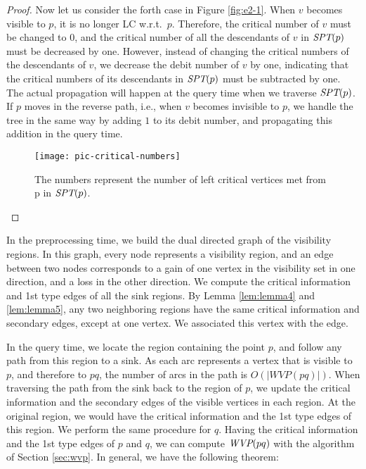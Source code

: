 \documentclass[5p]{elsarticle}
\def\WVP{\mbox{\it{WVP}}}
\def\SPT{\mbox{\it{SPT}}}
\begin{document}
\begin{proof}
Now let us consider the forth case in Figure \ref{fig:e2-1}. When $v$ becomes visible to $p$,
it is no longer LC w.r.t.\ $p$. Therefore, the critical number of $v$ must be changed to $0$,
and the critical number of all the descendants of $v$ in $\SPT(p)$ must be decreased by one.
However, instead of changing the critical numbers of the descendants of $v$, 
we decrease the debit number of $v$ by one, indicating that the critical numbers of 
its descendants in $\SPT(p)$ must be subtracted by one. The actual propagation 
will happen at the query time when we traverse $\SPT(p)$. 
If $p$ moves in the reverse path, i.e., when $v$ becomes 
invisible to $p$, we handle the tree in the same way by adding
$1$ to its debit number, and propagating this addition in
the query time.

\begin{figure}[h]
  \centering
  \texttt{[image: pic-critical-numbers]}  
  \caption{
The numbers represent the number of left critical vertices met from p in $\SPT(p)$.}
  \label{fig:critical-numbers}
\end{figure}
\end{proof}


In the preprocessing time, we build the dual directed graph of the visibility 
regions. In this graph, every node represents a visibility 
region, and an edge between two nodes corresponds to a gain of one vertex 
in the visibility set in one direction, and a loss in the other direction.
We compute the critical information and 1st type edges of all 
the sink regions. By Lemma \ref{lem:lemma4} and \ref{lem:lemma5}, any two neighboring regions
have the same critical information and secondary edges, except at one vertex. 
We associated this vertex with the edge. 

In the query time, we locate the region containing the point $p$, and follow any path 
from this region to a sink. As each arc represents a vertex that is visible to
$p$, and therefore to $pq$, the number of arcs in the path is 
$O(|WVP(pq)|)$. When traversing the path from the sink back to the region of $p$, 
we update the critical information and the secondary edges of the visible vertices 
in each region. At the original region, we would have the critical information
and the 1st type edges of this region. 
We perform the same procedure for $q$.
Having the critical information and the 1st type edges of $p$ and $q$, we can 
compute $\WVP(pq)$ with the algorithm of Section \ref{sec:wvp}. 
In general, we have the following theorem:
\end{document}
